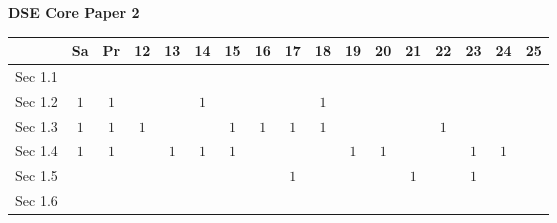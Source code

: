 \documentclass[12pt, a4paper]{article}
\begin{document}
\begin{absolutelynopagebreak}
\begin{center}
\textbf{DSE Core Paper 2}
\end{center}
\begin{center}
\begin{tabular}{|l|c|c|c|c|c|c|c|c|c|c|c|c|c|c|c|c|}
\hline
        & Sa & Pr & 12 & 13 & 14 & 15 & 16 & 17 & 18 & 19 & 20 & 21 & 22 & 23 & 24 & 25 \\\hline\hline
Sec 1.1 &  &  &  &  &  &  &  &  &  &  &  &  &  &  &  &  \\\hline
Sec 1.2 &  $1$ &  $1$ &  &  &  $1$ &  &  &  &  $1$ &  &  &  &  &  &  &  \\\hline
Sec 1.3 &  $1$ &  $1$ &  $1$ &  &  &  $1$ &  $1$ &  $1$ &  $1$ &  &  &  &  $1$ &  &  &  \\\hline
Sec 1.4 &  $1$ &  $1$ &  &  $1$ &  $1$ &  $1$ &  &  &  &  $1$ &  $1$ &  &  &  $1$ &  $1$ &  \\\hline
Sec 1.5 &  &  &  &  &  &  &  &  $1$ &  &  &  &  $1$ &  &  $1$ &  &  \\\hline
Sec 1.6 &  &  &  &  &  &  &  &  &  &  &  &  &  &  &  &  \\\hline
\end{tabular}
\end{center}
\end{absolutelynopagebreak}
\end{document}
